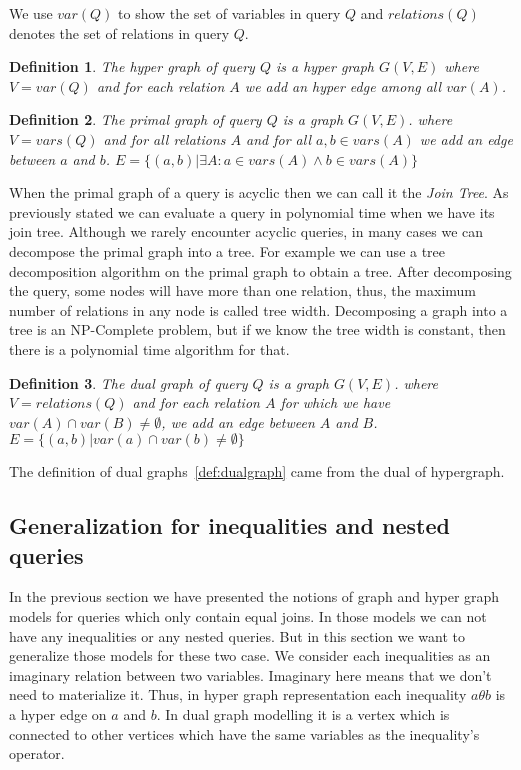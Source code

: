 \documentclass[12pt]{article}
\newtheorem{definition}{Definition}
\begin{document}
We use $var(Q)$ to show the set of variables in query $Q$ and $relations(Q)$ denotes the set of relations in query $Q$.
\begin{definition}
\label{def:hypergraph} 
The hyper graph of query $Q$ is a hyper graph $G(V,E)$ where $V=var(Q)$ and for each relation $A$ we add an hyper edge among all $var(A)$.
\end{definition}
\begin{definition}
\label{def:primalgraph}
The primal graph of query $Q$ is a graph $G(V,E)$. where $V=vars(Q)$ and for all relations $A$ and for all $a,b\in vars(A)$ we add an edge between $a$ and $b$. $E=\{(a,b)|\exists A: a\in vars(A)\land b\in vars(A)\}$
\end{definition}
When the primal graph of a query is acyclic then we can call it the \emph{Join Tree}. As previously stated we can evaluate a query in polynomial time when we have its join tree. Although we rarely encounter acyclic queries, in many cases we can decompose the primal graph into a tree. For example we can use a tree decomposition algorithm on the primal graph to obtain a tree. After decomposing the query, some nodes will have more than one relation, thus, the maximum number of relations in any node is called tree width. 
Decomposing a graph into a tree is an NP-Complete problem, but if we know the tree width is constant, then there is a polynomial time algorithm for that. \par
\begin{definition}
\label{def:dualgraph}
The dual graph of query $Q$ is a graph $G(V,E)$. where $V=relations(Q)$ and for each relation $A$ for which we have $var(A)\cap var(B)\neq \emptyset$, we add an edge between $A$ and $B$. $E=\{(a,b)|var(a)\cap var(b)\neq\emptyset\}$
\end{definition}
The definition of dual graphs~\eqref{def:dualgraph} came from the dual of hypergraph. 
\subsection{Generalization for inequalities and nested queries}
\label{sec:generalization}
In the previous section we have presented the notions of graph and hyper graph models for queries which only contain equal joins. In those models we can not have any inequalities or any nested queries. But in this section we want to generalize those models for these two case. We consider each inequalities as an imaginary relation between two variables. Imaginary here means that we don't need to materialize it. Thus, in hyper graph representation each inequality $a\theta b$ is a hyper edge on $a$ and $b$. In dual graph modelling it is a vertex which is connected to other vertices which have the same variables as the inequality's operator.\\\par
\end{document}
